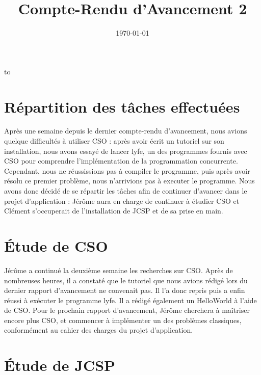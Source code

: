 \documentclass[a4paper,11pt]{article}
\date{\today}
\title{Compte-Rendu d'Avancement 2}
\makeatletter
\def\clap#1{\hbox to 0pt{\hss #1\hss}} %
\def\ligne#1{\hbox to \hsize{\vbox{\centering #1}}} %
\def\haut#1#2#3{\hbox to \hsize{\rlap{\vtop{\raggedright #1}}\hss \clap{\vtop{\centering #2}} \hss \llap{\vtop{\raggedleft #3}}}}%
\def\bas#1#2#3{\hbox to \hsize{\rlap{\vbox{\raggedright #1}} \hss \clap{\vbox{\centering #2}} \hss \llap{\vbox{\raggedleft #3}}}}%
\def\maketitle{%
	  \thispagestyle{empty}\vbox to \vsize{%
		\vspace{5mm} \ligne{\Huge \@title}
		\vspace{1cm} \haut{Supervisé par \@supervisor}{}{\@follower}
		\vspace{3mm}\hrule
		\vfill
		\bas{}{\@location, \@date}{}
		}%
	  \cleardoublepage
	  }
\makeatother
\begin{document}
\maketitle

\section{Répartition des tâches effectuées}

Après une semaine depuis le dernier compte-rendu d'avancement, nous avions quelque difficultés à utiliser CSO : après avoir écrit un tutoriel sur son installation, nous avons essayé de lancer lyfe, un des programmes fournis avec CSO pour comprendre l'implémentation de la programmation concurrente.
Cependant, nous ne réussissions pas à compiler le programme, puis après avoir résolu ce premier problème, nous n'arrivions pas à executer le programme. Nous avons donc décidé de se répartir les tâches afin de continuer d'avancer dans le projet d'application : Jérôme aura en charge de continuer à étudier CSO et Clément s'occuperait de l'installation de JCSP et de sa prise en main.

\section{\'{E}tude de CSO}

Jérôme a continué la deuxième semaine les recherches sur CSO. Après de nombreuses heures, il a constaté que le tutoriel que nous avions rédigé lors du dernier rapport d'avancement ne convenait pas. Il l'a donc repris puis a enfin réussi à exécuter le programme lyfe. Il a rédigé également un HelloWorld à l'aide de CSO. Pour le prochain rapport d'avancement, Jérôme cherchera à maîtriser encore plus CSO, et commencer à implémenter un des problèmes classiques, conformément au cahier des charges du projet d'application.

\section{\'{E}tude de JCSP}
\end{document}
